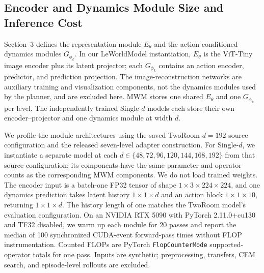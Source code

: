 \subsection{Encoder and Dynamics Module Size and Inference Cost}
\label{app:component_profiles}

Section~3 defines the representation module $E_\theta$ and the action-conditioned dynamics modules $G_{\phi_k}$. In our LeWorldModel instantiation, $E_\theta$ is the ViT-Tiny image encoder plus its latent projector; each $G_{\phi_k}$ contains an action encoder, predictor, and prediction projection. The image-reconstruction networks are auxiliary training and visualization components, not the dynamics modules used by the planner, and are excluded here. MWM stores one shared $E_\theta$ and one $G_{\phi_k}$ per level. The independently trained Single-\(d\) models each store their own encoder--projector and one dynamics module at width $d$.

We profile the module architectures using the saved TwoRoom $d=192$ source configuration and the released seven-level adapter construction. For Single-\(d\), we instantiate a separate model at each $d\in\{48,72,96,120,144,168,192\}$ from that source configuration; its components have the same parameter and operator counts as the corresponding MWM components. We do not load trained weights. The encoder input is a batch-one FP32 tensor of shape $1\times3\times224\times224$, and one dynamics prediction takes latent history $1\times1\times d$ and an action block $1\times1\times10$, returning $1\times1\times d$. The history length of one matches the TwoRoom model's evaluation configuration. On an NVIDIA RTX 5090 with PyTorch 2.11.0+cu130 and TF32 disabled, we warm up each module for 20 passes and report the median of 100 synchronized CUDA-event forward-pass times without FLOP instrumentation. Counted FLOPs are PyTorch \texttt{FlopCounterMode} supported-operator totals for one pass. Inputs are synthetic; preprocessing, transfers, CEM search, and episode-level rollouts are excluded.

